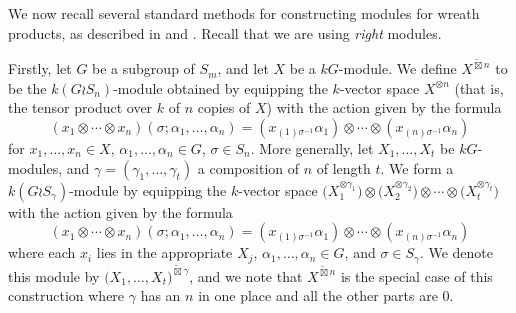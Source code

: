 \documentclass[10pt]{article}
\theoremstyle{definition}
\begin{document}
We now recall several standard methods for constructing modules for wreath products, as described in
\cite[Section 4.3]{JAMKER} and \cite[Section 3]{CHTAN}. Recall that we are using \textit{right} modules.

Firstly, let $G$ be a subgroup of $S_m$, and
let $X$ be a $kG$-module. We define $X^{\widetilde\boxtimes n}$ to be the $k(G{\wr}S_n)$-module obtained by
equipping the $k$-vector space $X^{\otimes n}$ (that is, the tensor product over $k$ of $n$ copies of $X$) with the action given by the
formula
\[
	(x_1\otimes\cdots\otimes x_n)(\sigma;\alpha_1,\ldots,\alpha_n) = (x_{(1)\sigma^{-1}}\alpha_1)\otimes\cdots
	\otimes(x_{(n)\sigma^{-1}}\alpha_n)
\]
for $x_1,\ldots,x_n \in X$, $\alpha_1,\ldots,\alpha_n \in G$, $\sigma \in S_n$.
More generally, let $X_1,\ldots,X_t$ be $kG$-modules, and $\gamma = (\gamma_1,\ldots,\gamma_t)$ a composition of $n$ of length $t$.
We form a $k(G{\wr}S_{\gamma})$-module by equipping the $k$-vector space
$\bigl(X^{\otimes \gamma_1}_1\bigr)\otimes\bigl(X^{\otimes \gamma_2}_2\bigr)\otimes\cdots\otimes\bigl(X^{\otimes \gamma_t}_t\bigr)$
with the action given by the formula
\[
	(x_1\otimes\cdots\otimes x_n)(\sigma;\alpha_1,\ldots,\alpha_n) = (x_{(1)\sigma^{-1}}\alpha_1)\otimes\cdots
	\otimes(x_{(n)\sigma^{-1}}\alpha_n)
\]
where each $x_i$ lies in the appropriate $X_j$, $\alpha_1,\ldots,\alpha_n \in G$, and $\sigma \in S_{\gamma}$. We denote this module by
$\bigl(X_1,\ldots,X_t\bigr)^{\widetilde\boxtimes \gamma}$, and we note that $X^{\widetilde\boxtimes n}$ is the
special case of this construction where $\gamma$ has an $n$ in one place and all the other parts are 0.
\end{document}
